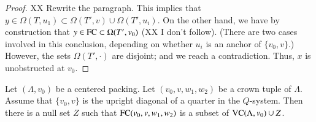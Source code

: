 \begin{proof}
XX Rewrite the paragraph.
This implies that $y\in
\Omega(T,u_1) \subset \Omega(T',v) \cup \Omega(T',u_i)$.  
On the other hand, we have by
construction that $y\in {\operatorname{FC}} \subset \Omega(T',v_0)$  (XX I don't follow).  
(There are
two cases involved in this conclusion, depending on whether $u_i$
is an anchor of $\{v_0,v\}$.)  However, the sets $\Omega(T',\cdot)$ are
disjoint; and we reach a contradiction.  Thus, 
$x$ is unobstructed at $v_0$.
%
\end{proof}

\begin{lemma}  
Let $(\Lambda,v_0)$ be a centered packing.
Let $(v_0,v,w_1,w_2)$ be a crown tuple of $\Lambda$. Assume that
 $\{v_0,v\}$ is the upright diagonal of a quarter
in the $Q$-system.  Then there is a null set $Z$ such
that ${\operatorname{FC}}(v_0,v,w_1,w_2)$ is
a subset of ${\operatorname{VC}}(\Lambda,v_0)\cup Z$.
\end{lemma}

